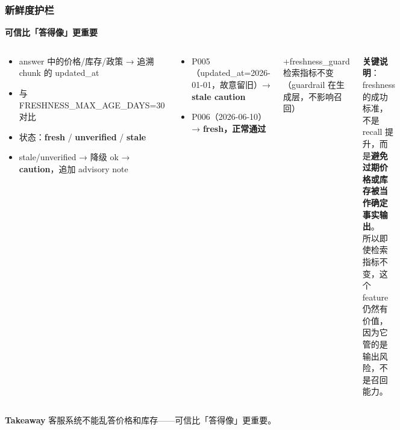 \documentclass[aspectratio=169,10pt]{beamer}
\newcommand{\takeaway}[1]{%
  \vfill%
  \begin{tcolorbox}[
    colback=Ctakebg, colframe=Ctakebg,
    arc=0pt, boxrule=0pt,
    left=7pt, right=7pt, top=4pt, bottom=4pt,
    width=\linewidth, nobeforeafter
  ]%
    {\scriptsize\color{white}\textbf{Takeaway}\enspace%
     \color{white!88!Ctakebg}#1}%
  \end{tcolorbox}%
}
\newcommand{\hi}[1]{{\bfseries\color{Cgreen}#1}}      %
\newcommand{\bad}[1]{{\bfseries\color{Cred}#1}}       %
\newcommand{\mono}[1]{{\ttfamily\small\color{Cblue!90!black}#1}}  %
\begin{document}
\begin{frame}
\frametitle{新鲜度护栏}

{\small\bfseries\color{Cmuted}可信比「答得像」更重要}\\[0.08cm]
\begin{columns}[T]
\begin{tcolorbox}[tcgray, title={\color{Ctextdark}机制}]
\small\begin{itemize}\setlength\itemsep{0.1em}
  \item answer 中的价格/库存/政策 → 追溯\\chunk 的 \mono{updated\_at}
  \item 与 \mono{FRESHNESS\_MAX\_AGE\_DAYS=30} 对比
  \item 状态：\hi{fresh} / {\bfseries\color{orange}unverified} / \bad{stale}
  \item stale/unverified → 降级 ok → {\bfseries\color{orange}caution}，追加 advisory note
\end{itemize}
\end{tcolorbox}
\begin{tcolorbox}[tcgray, title={\color{Ctextdark}演示}]
\small\begin{itemize}\setlength\itemsep{0.1em}
  \item P005（\mono{updated\_at=2026-01-01}，故意留旧）→ \bad{stale caution}
  \item P006（\mono{2026-06-10}）→ \hi{fresh，正常通过}
\end{itemize}
\end{tcolorbox}

\begin{tcolorbox}[tcgreen, title={\color{Cgreen}Ablation 验证}]
\small
+freshness\_guard 检索指标不变\\
（guardrail 在生成层，不影响召回）
\end{tcolorbox}
\begin{tcolorbox}[tcblue]
\small\textbf{关键说明}：freshness 的成功标准，不是 recall 提升，而是\textbf{避免过期价格或库存被当作确定事实输出}。\\[0.1em]
所以即使检索指标不变，这个 feature 仍然有价值，因为它管的是输出风险，不是召回能力。
\end{tcolorbox}
\end{columns}

\takeaway{客服系统不能乱答价格和库存——可信比「答得像」更重要。}
\end{frame}
\end{document}
